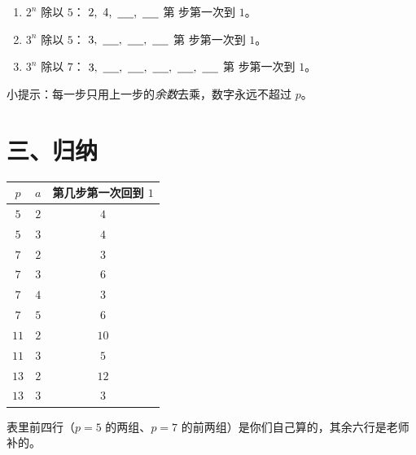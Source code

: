 \begin{dongshou}[每组只算到第一次出现 \(1\) 为止]
  \begin{enumerate}
    \item \(2^n\) 除以 \(5\)：
      \(2,\ 4,\ \underline{\hspace{1.4em}},\ \underline{\hspace{1.4em}}\)
      \quad 第 \underline{\hspace{1.2em}} 步第一次到 \(1\)。
    \item \(3^n\) 除以 \(5\)：
      \(3,\ \underline{\hspace{1.4em}},\ \underline{\hspace{1.4em}},\ \underline{\hspace{1.4em}}\)
      \quad 第 \underline{\hspace{1.2em}} 步第一次到 \(1\)。
    \item \(3^n\) 除以 \(7\)：
      \(3,\ \underline{\hspace{1.4em}},\ \underline{\hspace{1.4em}},\ \underline{\hspace{1.4em}},
        \ \underline{\hspace{1.4em}},\ \underline{\hspace{1.4em}}\)
      \quad 第 \underline{\hspace{1.2em}} 步第一次到 \(1\)。
  \end{enumerate}
  小提示：每一步只用上一步的\emph{余数}去乘，数字永远不超过 \(p\)。
\end{dongshou}

\section*{三、归纳}

\begin{example}
  \begin{center}
  \begin{tabular}{@{}ccc@{}}
    \toprule
    \(p\) & \(a\) & 第几步第一次回到 \(1\) \\
    \midrule
    \(5\) & \(2\) & \(4\) \\
    \(5\) & \(3\) & \(4\) \\
    \(7\) & \(2\) & \(3\) \\
    \(7\) & \(3\) & \(6\) \\
    \(7\) & \(4\) & \(3\) \\
    \(7\) & \(5\) & \(6\) \\
    \(11\) & \(2\) & \(10\) \\
    \(11\) & \(3\) & \(5\) \\
    \(13\) & \(2\) & \(12\) \\
    \(13\) & \(3\) & \(3\) \\
    \bottomrule
  \end{tabular}
  \end{center}
  表里前四行（\(p=5\) 的两组、\(p=7\) 的前两组）是你们自己算的，其余六行是老师补的。
\end{example}


